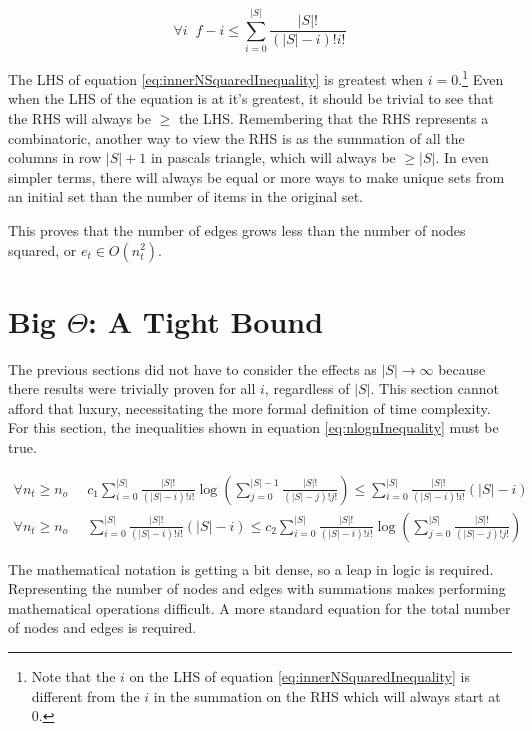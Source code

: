 \documentclass{article}
\begin{document}
\begin{equation}
    \forall i\;\; f-i\le\sum_{i=0}^{|S|}\frac{|S|!}{(|S|-i)!i!}
    \label{eq:innerNSquaredInequality}
\end{equation}

The LHS of equation \ref{eq:innerNSquaredInequality} is greatest when $i=0$.\footnote{Note that the $i$ on the LHS of equation \ref{eq:innerNSquaredInequality} is different from the $i$ in the summation on the RHS which will always start at $0$.} Even when the LHS of the equation is at it's greatest, it should be trivial to see that the RHS will always be $\ge$ the LHS. Remembering that the RHS represents a combinatoric, another way to view the RHS is as the summation of all the columns in row $|S|+1$ in pascals triangle, which will always be $\ge|S|$. In even simpler terms, there will always be equal or more ways to make unique sets from an initial set than the number of items in the original set.

This proves that the number of edges grows less than the number of nodes squared, or $e_t\in O(n_t^2)$.

\section{Big $\Theta$: A Tight Bound}
\label{sec:TightBound}

The previous sections did not have to consider the effects as $|S|\to \infty$ because there results were trivially proven for all $i$, regardless of $|S|$. This section cannot afford that luxury, necessitating the more formal definition of time complexity. For this section, the inequalities shown in equation \ref{eq:nlognInequality} must be true.

\begin{equation}
    \begin{split}
        \forall n_t\ge n_o \;\; &
        c_1\sum_{i=0}^{|S|}\frac{|S|!}{(|S|-i)!i!}
        \log \left( \sum_{j=0}^{|S|-1}\frac{|S|!}{(|S|-j)!j!} \right)
        \le
        \sum_{i=0}^{|S|}\frac{|S|!}{(|S|-i)!i!}(|S|-i)
        \\
        \forall n_t\ge n_o \;\; &
        \sum_{i=0}^{|S|}\frac{|S|!}{(|S|-i)!i!}(|S|-i)
        \le
        c_2\sum_{i=0}^{|S|}\frac{|S|!}{(|S|-i)!i!}
        \log \left( \sum_{j=0}^{|S|}\frac{|S|!}{(|S|-j)!j!} \right)
    \end{split}
    \label{eq:nlognInequality}
\end{equation}

The mathematical notation is getting a bit dense, so a leap in logic is required. Representing the number of nodes and edges with summations makes performing mathematical operations difficult. A more standard equation for the total number of nodes and edges is required.
\end{document}
